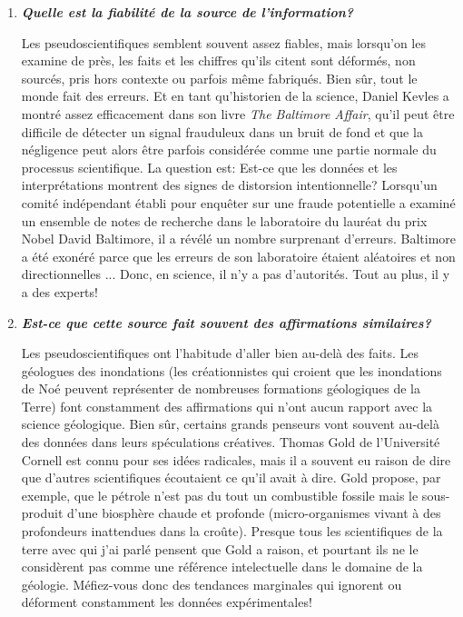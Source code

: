 	\begin{enumerate}[label=\protect\circledbullet{\arabic*},leftmargin=15mm]
		\item \textit{\textbf{Quelle est la fiabilit\'e de la source de l'information?}}

		Les pseudoscientifiques semblent souvent assez fiables, mais lorsqu'on les examine de près, les faits et les chiffres qu'ils citent sont d\'eform\'es, non sourc\'es, pris hors contexte ou parfois même fabriqu\'es. Bien sûr, tout le monde fait des erreurs. Et en tant qu'historien de la science, Daniel Kevles a montr\'e assez efficacement dans son livre \textit{The Baltimore Affair}, qu'il peut être difficile de d\'etecter un signal frauduleux dans un bruit de fond et que la n\'egligence peut alors être parfois consid\'er\'ee comme une partie normale du processus scientifique. La question est: Est-ce que les donn\'ees et les interpr\'etations montrent des signes de distorsion intentionnelle? Lorsqu'un comit\'e ind\'ependant \'etabli pour enquêter sur une fraude potentielle a examin\'e un ensemble de notes de recherche dans le laboratoire du laur\'eat du prix Nobel David Baltimore, il a r\'ev\'el\'e un nombre surprenant d'erreurs. Baltimore a \'et\'e exon\'er\'e parce que les erreurs de son laboratoire \'etaient al\'eatoires et non directionnelles ... Donc, en science, il n'y a pas d'autorit\'es. Tout au plus, il y a des experts!

		\item \textit{\textbf{Est-ce que cette source fait souvent des affirmations similaires?}}

		Les pseudoscientifiques ont l'habitude d'aller bien au-delà des faits. Les g\'eologues des inondations (les cr\'eationnistes qui croient que les inondations de No\'e peuvent repr\'esenter de nombreuses formations g\'eologiques de la Terre) font constamment des affirmations qui n'ont aucun rapport avec la science g\'eologique. Bien sûr, certains grands penseurs vont souvent au-delà des donn\'ees dans leurs sp\'eculations cr\'eatives. Thomas Gold de l'Universit\'e Cornell est connu pour ses id\'ees radicales, mais il a souvent eu raison de dire que d'autres scientifiques \'ecoutaient ce qu'il avait à dire. Gold propose, par exemple, que le p\'etrole n'est pas du tout un combustible fossile mais le sous-produit d'une biosphère chaude et profonde (micro-organismes vivant à des profondeurs inattendues dans la croûte). Presque tous les scientifiques de la terre avec qui j'ai parl\'e pensent que Gold a raison, et pourtant ils ne le considèrent pas comme une r\'ef\'erence intelectuelle dans le domaine de la g\'eologie. M\'efiez-vous donc des tendances marginales qui ignorent ou d\'eforment constamment les donn\'ees exp\'erimentales!


\end{enumerate}
